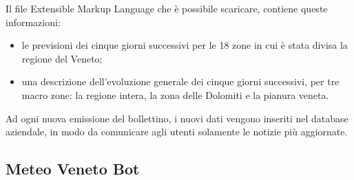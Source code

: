 Il file \gls{Extensible Markup Language} che è possibile scaricare, contiene queste informazioni:
\begin{itemize}
	\item le previsioni dei cinque giorni successivi per le 18 zone in cui è stata divisa la regione del Veneto;
	\item una descrizione dell'evoluzione generale dei cinque giorni successivi, per tre macro zone: la regione intera, la zona delle Dolomiti e la pianura veneta.
\end{itemize}

Ad ogni nuova emissione del bollettino, i nuovi dati vengono inseriti nel database aziendale, in modo da comunicare agli utenti solamente le notizie più aggiornate.

\subsection{Meteo Veneto Bot}
